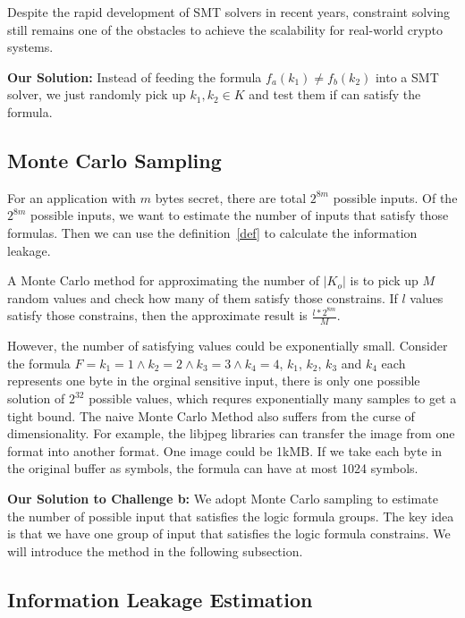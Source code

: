 Despite the rapid development of SMT solvers in recent years, constraint solving still
remains one of the obstacles to achieve the scalability for real-world crypto systems.

\vspace*{2pt}
\textbf{Our Solution:}
Instead of feeding the formula $f_a(k_1) \neq f_b(k_2)$ into a SMT solver, we just
randomly pick up $k_1, k_2 \in K$ and test them if can satisfy the formula.

       
\subsection{Monte Carlo Sampling}
\label{MCreasons}
For an application with $m$ bytes secret, there are total $2^{8m}$ possible inputs. Of the
$2^{8m}$ possible inputs, we want to estimate the number of inputs that satisfy those formulas.
Then we can use the definition~\ref{def} to calculate the information leakage.

A Monte Carlo method for approximating the number of $|K_o|$ is to pick up 
$M$ random values and check how many of them satisfy those constrains. If $l$ values
satisfy those constrains, then the approximate result is $\frac{l*2^{8m}}{M}$.

However, the number of satisfying values could be exponentially small. Consider the formula
$F={k_1} = 1\land{k_2} = 2\land{k_3} = 3\land{k_4} = 4$, $k_1$, $k_2$, $k_3$ and $k_4$ each represents
one byte in the orginal sensitive input, there is only one possible solution of $2^{32}$ possible
values, which requres exponentially many samples to get a tight bound. 
The naive Monte Carlo Method also suffers from the curse of dimensionality. For example, 
the libjpeg libraries can transfer the image from one format into another format. One image could
be 1kMB. If we take each byte in the original buffer as symbols, the formula can have at most
1024 symbols. 

\vspace*{6pt}
\textbf{Our Solution to Challenge b:}
We adopt Monte Carlo sampling to estimate the number of possible input
that satisfies the logic formula groups. The key idea is that we have one group of input that satisfies
the logic formula constrains.  We will
introduce the method in the following subsection.


\subsection{Information Leakage Estimation}

